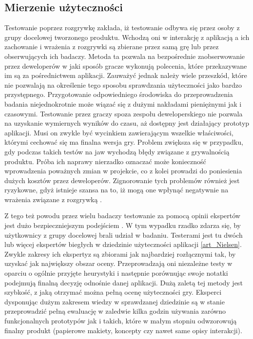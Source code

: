 \documentclass[a4paper,12pt,numbers=noenddot]{report}
\begin{document}
\subsection{Mierzenie użyteczności}
Testowanie poprzez rozgrywkę zakłada, iż testowanie odbywa się przez osoby z grupy docelowej tworzonego produktu\cite{art_evaluatingPlayabilityMG}. Wchodzą oni w interakcję z aplikacją a ich zachowanie i wrażenia z rozgrywki są zbierane przez samą grę lub przez obserwujących ich badaczy. Metoda ta pozwala na bezpośrednie zaobserwowanie przez deweloperów w jaki sposób gracze wykonują polecenia, które przekazywane im są za pośrednictwem aplikacji.
Zauważyć jednak należy wiele przeszkód, które nie pozwalają na określenie tego sposobu sprawdzania użyteczności jako bardzo przystępnego. Przygotowanie odpowiedniego środowiska do przeprowadzenia badania niejednokrotnie może wiązać się z dużymi nakładami pieniężnymi jak i czasowymi. Testowanie przez graczy spoza zespołu deweloperskiego nie pozwala na uzyskanie wymiernych wyników do czasu, aż dostępny jest działający prototyp aplikacji. Musi on zwykle być wycinkiem zawierającym wszelkie właściwości, którymi cechować się ma finalna wersja gry. Problem zwiększa się w przypadku, gdy podczas takich testów na jaw wychodzą błędy związane z grywalnością produktu. Próba ich naprawy nierzadko oznaczać może konieczność wprowadzenia poważnych zmian w projekcie, co z kolei prowadzi do poniesienia dużych kosztów przez deweloperów. Zignorowanie tych problemów również jest ryzykowne, gdyż istnieje szansa na to, iż mogą one wpłynąć negatywnie na wrażenia związane z rozgrywką \cite{art_evaluationOfMG}.

Z tego też powodu przez wielu badaczy testowanie za pomocą opinii ekspertów jest dużo bezpieczniejszym podejściem \cite{art_UsabilityTestingComp}. W tym wypadku rzadko zdarza się, by użytkownicy z grupy docelowej brali udział w badaniu. Testerami jest tu dwóch lub więcej ekspertów biegłych w dziedzinie użyteczności aplikacji \ref{art_Nielsen}. Zwykle zakresy ich ekspertyz są zbiorami jak najbardziej rozłącznymi tak, by uzyskać jak największy obszar oceny. Przeprowadzają oni niezależne testy w oparciu o ogólnie przyjęte heurystyki i następnie porównując swoje notatki podejmują finalną decyzję odnośnie danej aplikacji.
Dużą zaletą tej metody jest szybkość, z jaką otrzymać można pełną ocenę użyteczności gry. Eksperci dysponując dużym zakresem wiedzy w sprawdzanej dziedzinie są w stanie przeprowadzić pełną ewaluację w zaledwie kilka godzin używania zarówno funkcjonalnych prototypów jak i takich, które w małym stopniu odwzorowują finalny produkt (papierowe makiety, koncepty czy nawet same opisy interakcji). 
\end{document}
